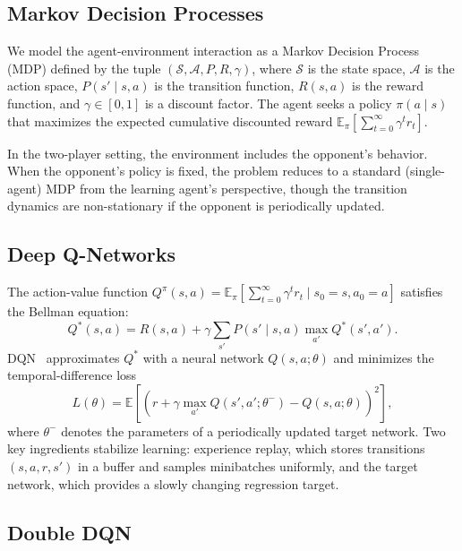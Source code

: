 \documentclass[letterpaper]{article}
\begin{document}
\subsection{Markov Decision Processes}

We model the agent-environment interaction as a Markov Decision Process (MDP) defined by the tuple $(\mathcal{S}, \mathcal{A}, P, R, \gamma)$, where $\mathcal{S}$ is the state space, $\mathcal{A}$ is the action space, $P(s' \mid s, a)$ is the transition function, $R(s, a)$ is the reward function, and $\gamma \in [0, 1]$ is a discount factor.
The agent seeks a policy $\pi(a \mid s)$ that maximizes the expected cumulative discounted reward $\mathbb{E}_\pi\left[\sum_{t=0}^{\infty} \gamma^t r_t\right]$.

In the two-player setting, the environment includes the opponent's behavior.
When the opponent's policy is fixed, the problem reduces to a standard (single-agent) MDP from the learning agent's perspective, though the transition dynamics are non-stationary if the opponent is periodically updated.

\subsection{Deep Q-Networks}

The action-value function $Q^\pi(s, a) = \mathbb{E}_\pi\left[\sum_{t=0}^{\infty} \gamma^t r_t \mid s_0 = s, a_0 = a\right]$ satisfies the Bellman equation:
\begin{equation}\label{eq:bellman}
    Q^*(s, a) = R(s, a) + \gamma \sum_{s'} P(s' \mid s, a) \max_{a'} Q^*(s', a').
\end{equation}
DQN~\cite{mnih2015human} approximates $Q^*$ with a neural network $Q(s, a; \theta)$ and minimizes the temporal-difference loss
\begin{equation}\label{eq:dqn-loss}
    L(\theta) = \mathbb{E}\left[\left(r + \gamma \max_{a'} Q(s', a'; \theta^{-}) - Q(s, a; \theta)\right)^2\right],
\end{equation}
where $\theta^{-}$ denotes the parameters of a periodically updated target network.
Two key ingredients stabilize learning: experience replay, which stores transitions $(s, a, r, s')$ in a buffer and samples minibatches uniformly, and the target network, which provides a slowly changing regression target.

\subsection{Double DQN}
\end{document}
